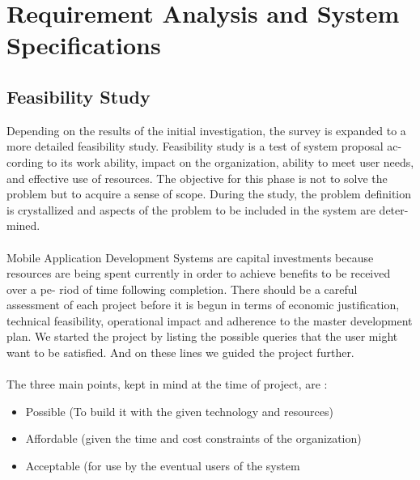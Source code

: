 \chapter{Requirement Analysis and System Specifications}
\section{Feasibility Study}
Depending on the results of the initial investigation, the survey is expanded to a
more detailed feasibility study. Feasibility study is a test of system proposal ac-
cording to its work ability, impact on the organization, ability to meet user needs,
and effective use of resources. The objective for this phase is not to solve the
problem but to acquire a sense of scope. During the study, the problem definition
is crystallized and aspects of the problem to be included in the system are deter-
mined.\\ \\
Mobile Application Development Systems are capital investments because resources
are being spent currently in order to achieve benefits to be received over a pe-
riod of time following completion. There should be a careful assessment of each
project before it is begun in terms of economic justification, technical feasibility,
operational impact and adherence to the master development plan.
We started the project by listing the possible queries that the user might want
to be satisfied. And on these lines we guided the project further.\\ \\
The three main points, kept in mind at the time of project, are :
\begin{itemize}
\item Possible (To build it with the given technology and resources)
\item Affordable (given the time and cost constraints of the organization)
\item Acceptable (for use by the eventual users of the system
\end{itemize}


